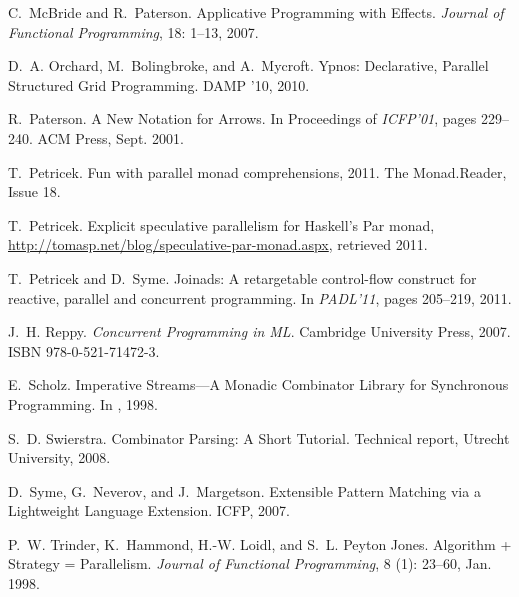 \documentclass{sigplanconf}
\begin{document}
\begin{thebibliography}{37}
C.~McBride and R.~Paterson.
\newblock Applicative Programming with Effects.
\newblock \emph{Journal of Functional Programming}, 18: 1--13, 2007.

D.~A. Orchard, M.~Bolingbroke, and A.~Mycroft.
\newblock Ypnos: Declarative, Parallel Structured Grid Programming.
\newblock DAMP '10, 2010.

R.~Paterson.
\newblock A New Notation for Arrows.
\newblock In Proceedings of \emph{ICFP'01}, pages
  229--240. ACM Press, Sept. 2001.

T.~Petricek.
\newblock Fun with parallel monad comprehensions, 2011{}.
\newblock The Monad.Reader, Issue 18.

T.~Petricek.
\newblock Explicit speculative parallelism for Haskell's Par monad,
\url{http://tomasp.net/blog/speculative-par-monad.aspx}, retrieved 2011.

T.~Petricek and D.~Syme.
\newblock Joinads: A retargetable control-flow construct for reactive, parallel
  and concurrent programming.
\newblock In \emph{PADL'11}, pages 205--219, 2011.

J.~H. Reppy.
\newblock \emph{Concurrent Programming in ML}.
\newblock Cambridge University Press, 2007.
\newblock ISBN 978-0-521-71472-3.

E.~Scholz.
\newblock Imperative Streams---A Monadic Combinator Library for Synchronous Programming.
\newblock In , 1998.

S.~D. Swierstra.
\newblock Combinator Parsing: A Short Tutorial.
\newblock Technical report, Utrecht University, 2008.

D.~Syme, G.~Neverov, and J.~Margetson.
\newblock Extensible Pattern Matching via a Lightweight Language Extension.
\newblock ICFP, 2007.

P.~W. Trinder, K.~Hammond, H.-W. Loidl, and S.~L. {Peyton Jones}.
\newblock Algorithm + {S}trategy = {P}arallelism.
\newblock \emph{Journal of Functional Programming}, 8 (1):
  23--60, Jan. 1998.


\end{thebibliography}
\end{document}

